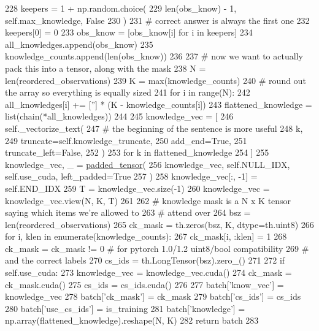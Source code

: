 \begin{DoxyCode}
228                 keepers = 1 + np.random.choice(
229                     len(obs\_know) - 1, self.max\_knowledge, \textcolor{keyword}{False}
230                 )
231                 \textcolor{comment}{# correct answer is always the first one}
232                 keepers[0] = 0
233                 obs\_know = [obs\_know[i] \textcolor{keywordflow}{for} i \textcolor{keywordflow}{in} keepers]
234             all\_knowledges.append(obs\_know)
235             knowledge\_counts.append(len(obs\_know))
236 
237         \textcolor{comment}{# now we want to actually pack this into a tensor, along with the mask}
238         N = len(reordered\_observations)
239         K = max(knowledge\_counts)
240         \textcolor{comment}{# round out the array so everything is equally sized}
241         \textcolor{keywordflow}{for} i \textcolor{keywordflow}{in} range(N):
242             all\_knowledges[i] += [\textcolor{stringliteral}{''}] * (K - knowledge\_counts[i])
243         flattened\_knowledge = list(chain(*all\_knowledges))
244 
245         knowledge\_vec = [
246             self.\_vectorize\_text(
247                 \textcolor{comment}{# the beginning of the sentence is more useful}
248                 k,
249                 truncate=self.knowledge\_truncate,
250                 add\_end=\textcolor{keyword}{True},
251                 truncate\_left=\textcolor{keyword}{False},
252             )
253             \textcolor{keywordflow}{for} k \textcolor{keywordflow}{in} flattened\_knowledge
254         ]
255         knowledge\_vec, \_ = \hyperlink{namespaceparlai_1_1agents_1_1legacy__agents_1_1seq2seq_1_1utils__v1_adb5a414ae439f14c54e8c760b91cc4c8}{padded\_tensor}(
256             knowledge\_vec, self.NULL\_IDX, self.use\_cuda, left\_padded=\textcolor{keyword}{True}
257         )
258         knowledge\_vec[:, -1] = self.END\_IDX
259         T = knowledge\_vec.size(-1)
260         knowledge\_vec = knowledge\_vec.view(N, K, T)
261 
262         \textcolor{comment}{# knowledge mask is a N x K tensor saying which items we're allowed to}
263         \textcolor{comment}{# attend over}
264         bsz = len(reordered\_observations)
265         ck\_mask = th.zeros(bsz, K, dtype=th.uint8)
266         \textcolor{keywordflow}{for} i, klen \textcolor{keywordflow}{in} enumerate(knowledge\_counts):
267             ck\_mask[i, :klen] = 1
268         ck\_mask = ck\_mask != 0  \textcolor{comment}{# for pytorch 1.0/1.2 uint8/bool compatibility}
269         \textcolor{comment}{# and the correct labels}
270         cs\_ids = th.LongTensor(bsz).zero\_()
271 
272         \textcolor{keywordflow}{if} self.use\_cuda:
273             knowledge\_vec = knowledge\_vec.cuda()
274             ck\_mask = ck\_mask.cuda()
275             cs\_ids = cs\_ids.cuda()
276 
277         batch[\textcolor{stringliteral}{'know\_vec'}] = knowledge\_vec
278         batch[\textcolor{stringliteral}{'ck\_mask'}] = ck\_mask
279         batch[\textcolor{stringliteral}{'cs\_ids'}] = cs\_ids
280         batch[\textcolor{stringliteral}{'use\_cs\_ids'}] = is\_training
281         batch[\textcolor{stringliteral}{'knowledge'}] = np.array(flattened\_knowledge).reshape(N, K)
282         \textcolor{keywordflow}{return} batch
283 
\end{DoxyCode}
